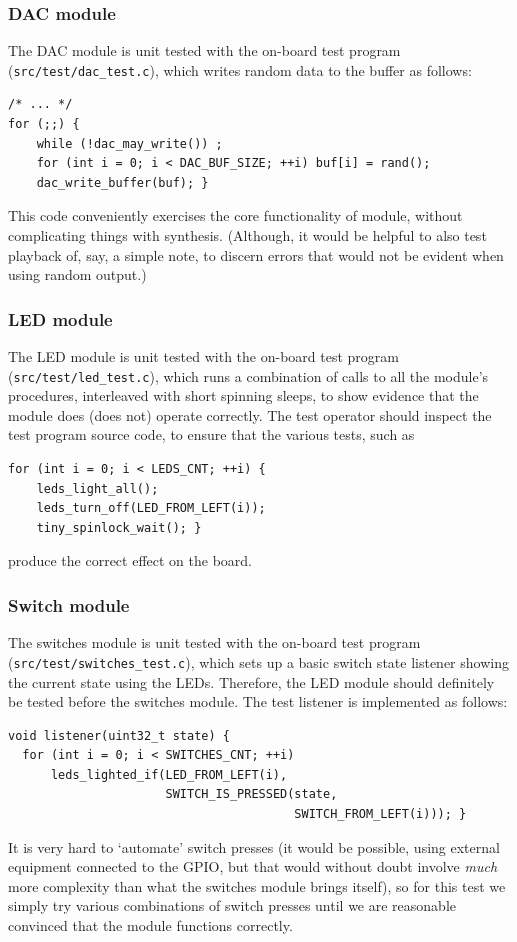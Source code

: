 \documentclass[a4paper,9pt]{article}
\begin{document}
\subsubsection{DAC module}
The DAC module is unit tested with the on-board test program
(\texttt{src/test/dac\_test.c}), which writes random data to the buffer  as
follows:
\begin{lstlisting}
/* ... */
for (;;) {
    while (!dac_may_write()) ;
    for (int i = 0; i < DAC_BUF_SIZE; ++i) buf[i] = rand();
    dac_write_buffer(buf); }
\end{lstlisting}
This code conveniently exercises the core functionality of module, without
complicating things with synthesis. (Although, it would be helpful to also
test playback of, say, a simple note, to discern errors that would not be
evident when using random output.)

\subsubsection{LED module}
The LED module is unit tested with the on-board test program
(\texttt{src/test/led\_test.c}), which runs a combination of calls to all the
module's procedures, interleaved with short spinning sleeps, to show evidence
that the module does (does not) operate correctly. The test operator should
inspect the test program source code, to ensure that the various tests, such
as 
\begin{lstlisting}
for (int i = 0; i < LEDS_CNT; ++i) {
    leds_light_all();
    leds_turn_off(LED_FROM_LEFT(i));
    tiny_spinlock_wait(); }
\end{lstlisting}
produce the correct effect on the board.

\subsubsection{Switch module}
The switches module is unit tested with the on-board test program
(\texttt{src/test/switches\_test.c}), which sets up a basic switch state
listener showing the current state using the LEDs. Therefore, the LED module
should definitely be tested before the switches module. The test listener is
implemented as follows:
\begin{lstlisting}
void listener(uint32_t state) {
  for (int i = 0; i < SWITCHES_CNT; ++i)
      leds_lighted_if(LED_FROM_LEFT(i),
                      SWITCH_IS_PRESSED(state,
                                        SWITCH_FROM_LEFT(i))); }
\end{lstlisting}
It is very hard to `automate' switch presses (it would be possible, using
external equipment connected to the GPIO, but that would without doubt involve
\emph{much} more complexity than what the switches module brings itself), so
for this test we simply try various combinations of switch presses until we
are reasonable convinced that the module functions correctly.
\end{document}
